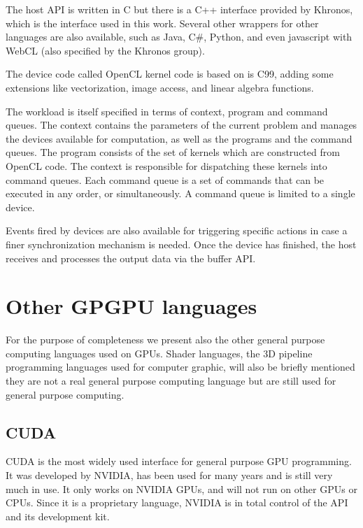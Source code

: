 The host \gls{API} is written in C but there is a C++ interface provided by Khronos, which is the interface used in this work. Several other wrappers for other languages are also available, such as Java, C\#, Python, and even javascript with WebCL (also specified by the Khronos group). 

The device code called \gls{OpenCL} kernel code is based on is C99, adding some extensions like vectorization, image access, and linear algebra functions.

The workload is itself specified in terms of context, program and command queues. The context contains the parameters of the current problem and manages the devices available for computation, as well as the programs and the command queues. The program consists of the set of kernels which are constructed from \gls{OpenCL} code. The context is responsible for dispatching these kernels into command queues. Each command queue is a set of commands that can be executed in any order, or simultaneously. A command queue is limited to a single device.\cite{OpenCLInAction,OpenCLProgrammingGuide}

Events fired by devices are also available for triggering specific actions in case a finer synchronization mechanism is needed. Once the device has finished, the host receives and processes the output data via the buffer \gls{API}.

\section{Other GPGPU languages}

For the purpose of completeness we present also the other general purpose computing languages used on \glspl{GPU}. Shader languages, the 3D pipeline programming languages used for computer graphic, will also be briefly mentioned they are not a real general purpose computing language but are still used for general purpose computing.

\subsection{CUDA}

\Gls{CUDA} is the most widely used interface for general purpose \gls{GPU} programming. It was developed by NVIDIA, has been used for many years and is still very much in use. It only works on NVIDIA \glspl{GPU}, and will not run on other \glspl{GPU} or \glspl{CPU}. Since it is a proprietary language, NVIDIA is in total control of the API and its development kit.

